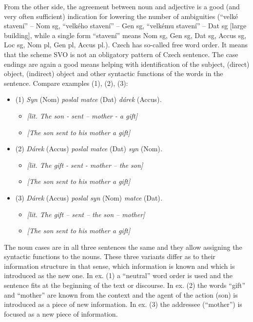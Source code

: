 \documentclass[]{../../metanetpaper}
\begin{document}
\begin{multicols}{2}
From the other side, the agreement between noun and adjective is a good (and very often sufficient) indication for lowering the number of ambiguities (“velké stavení” – Nom sg, “velkého stavení” – Gen sg, “velkému stavení” – Dat sg {[}large building{]}, while a single form “stavení” means Nom sg, Gen sg, Dat sg, Accus sg, Loc sg, Nom pl, Gen pl, Accus pl.).
Czech has so-called free word order. It means that the scheme SVO is not an obligatory pattern of Czech sentence. The case endings are again a good means helping with identification of the subject, (direct) object, (indirect) object and other syntactic functions of the words in the sentence. Compare examples (1), (2), (3):
\begin{itemize}
\item[] (1) \textit{Syn} (Nom) \textit{poslal matce} (Dat) \textit{dárek} (Accus)\textit{.}
\begin{itemize}
	\item[] \textit{{[}lit. The son - sent – mother - a gift{]}}
	\item[] \textit{{[}The son sent to his mother a gift{]}}
\end{itemize}
\item[]  (2) \textit{Dárek} (Accus) \textit{poslal matce} (Dat) \textit{syn} (Nom)\textit{.}
\begin{itemize}	
	\item[] \textit{{[}lit. The gift - sent - mother – the son{]}}
	\item[] \textit{{[}The son sent to his mother a gift{]}}
\end{itemize}
\item[] (3) \textit{Dárek} (Accus) \textit{poslal syn} (Nom) \textit{matce} (Dat)\textit{.}
\begin{itemize}	
	\item[] \textit{{[}lit. The gift – sent – the son – mother{]}}
	\item[] \textit{{[}The son sent to his mother a gift{]}}
\end{itemize}
\end{itemize}
The noun cases are in all three sentences the same and they allow assigning the syntactic functions to the nouns. These three variants differ as to their information structure in that sense, which information is known and which is introduced as the new one. In ex. (1) a “neutral” word order is used and the sentence fits at the beginning of the text or discourse. In ex. (2) the words “gift” and “mother” are known from the context and the agent of the action (son) is introduced as a piece of new information. In ex. (3) the addressee (“mother”) is focused as a new piece of information.

\end{multicols}
\end{document}
